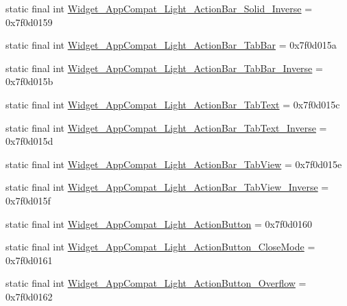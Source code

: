 \begin{DoxyCompactItemize}
\item 
static final int \mbox{\hyperlink{classandroid_1_1support_1_1design_1_1R_1_1style_aa0b0c2ca37bdb2f84bf6177dfa44d787}{Widget\+\_\+\+App\+Compat\+\_\+\+Light\+\_\+\+Action\+Bar\+\_\+\+Solid\+\_\+\+Inverse}} = 0x7f0d0159
\item 
static final int \mbox{\hyperlink{classandroid_1_1support_1_1design_1_1R_1_1style_abb13b7b02573cf138e9b71d0bfbe31c9}{Widget\+\_\+\+App\+Compat\+\_\+\+Light\+\_\+\+Action\+Bar\+\_\+\+Tab\+Bar}} = 0x7f0d015a
\item 
static final int \mbox{\hyperlink{classandroid_1_1support_1_1design_1_1R_1_1style_a88d71d2ee7d784d399f6ecca8aa2e9be}{Widget\+\_\+\+App\+Compat\+\_\+\+Light\+\_\+\+Action\+Bar\+\_\+\+Tab\+Bar\+\_\+\+Inverse}} = 0x7f0d015b
\item 
static final int \mbox{\hyperlink{classandroid_1_1support_1_1design_1_1R_1_1style_a4b115a3c2050ab4bf030e46c11eb60a0}{Widget\+\_\+\+App\+Compat\+\_\+\+Light\+\_\+\+Action\+Bar\+\_\+\+Tab\+Text}} = 0x7f0d015c
\item 
static final int \mbox{\hyperlink{classandroid_1_1support_1_1design_1_1R_1_1style_a7ca113d19597f857720ec90315950010}{Widget\+\_\+\+App\+Compat\+\_\+\+Light\+\_\+\+Action\+Bar\+\_\+\+Tab\+Text\+\_\+\+Inverse}} = 0x7f0d015d
\item 
static final int \mbox{\hyperlink{classandroid_1_1support_1_1design_1_1R_1_1style_a4c52b2eae6f6bf30c300ecd89d4d6f05}{Widget\+\_\+\+App\+Compat\+\_\+\+Light\+\_\+\+Action\+Bar\+\_\+\+Tab\+View}} = 0x7f0d015e
\item 
static final int \mbox{\hyperlink{classandroid_1_1support_1_1design_1_1R_1_1style_a98e2bea27b6e8d254311f92404db5f46}{Widget\+\_\+\+App\+Compat\+\_\+\+Light\+\_\+\+Action\+Bar\+\_\+\+Tab\+View\+\_\+\+Inverse}} = 0x7f0d015f
\item 
static final int \mbox{\hyperlink{classandroid_1_1support_1_1design_1_1R_1_1style_acd9731de4a76e4f4d04e4f015f364dbd}{Widget\+\_\+\+App\+Compat\+\_\+\+Light\+\_\+\+Action\+Button}} = 0x7f0d0160
\item 
static final int \mbox{\hyperlink{classandroid_1_1support_1_1design_1_1R_1_1style_a350ce12c6ed18a70a865f563d8e4c8bb}{Widget\+\_\+\+App\+Compat\+\_\+\+Light\+\_\+\+Action\+Button\+\_\+\+Close\+Mode}} = 0x7f0d0161
\item 
static final int \mbox{\hyperlink{classandroid_1_1support_1_1design_1_1R_1_1style_a3af81c29dece82cd8a9c1200d4287c5b}{Widget\+\_\+\+App\+Compat\+\_\+\+Light\+\_\+\+Action\+Button\+\_\+\+Overflow}} = 0x7f0d0162
\item 

\end{DoxyCompactItemize}
